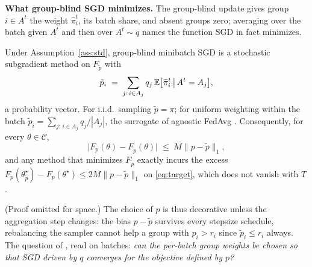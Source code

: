\noindent\textbf{What group-blind SGD minimizes.}
The group-blind update gives group $i\in A^t$ the weight $\widehat{\pi}^t_i$,
its batch share, and absent groups zero; averaging over the batch given
$A^t$ and then over $A^t\sim q$ \cite[Eq.~4]{rahimi2025agnostic} names the
function SGD in fact minimizes.

\begin{proposition}
\label{prop:surrogate}
Under Assumption~\ref{ass:std}, group-blind minibatch SGD is a stochastic
subgradient method on $F_{\tilde p}$ with
\begin{equation}
\tilde p_i\;=\;\sum_{j:\,i\in A_j} q_j\,\mathbb{E}\big[\widehat{\pi}^t_i\,\big|\,A^t=A_j\big],
\label{eq:ptilde}
\end{equation}
a probability vector. For i.i.d.\ sampling $\tilde p=\pi$; for uniform
weighting within the batch $\tilde p_i=\sum_{j:\,i\in A_j}q_j/|A_j|$, the
surrogate of agnostic \textsf{FedAvg} \cite[Eq.~2]{rahimi2025fedavot}.
Consequently, for every $\theta\in\mathcal{C}$,
\begin{equation}
\big|F_p(\theta)-F_{\tilde p}(\theta)\big|\;\le\;M\|p-\tilde p\|_1 ,
\label{eq:surrogate-gap}
\end{equation}
and any method that minimizes $F_{\tilde p}$ exactly incurs the excess
$F_p(\theta^\star_{\tilde p})-F_p(\theta^\star)\le 2M\|p-\tilde p\|_1$ on
\eqref{eq:target}, which does not vanish with $T$.
\end{proposition}
\noindent (Proof omitted for space.) The choice of $p$ is thus decorative
unless the aggregation step changes: the bias $p-\tilde p$ survives every
stepsize schedule, rebalancing the sampler cannot help a group with $p_i>r_i$
since $\tilde p_i\le r_i$ always. The question of \cite{rahimi2025fedavot},
read on batches: \emph{can the per-batch group weights be chosen so that SGD driven
by $q$ converges for the objective defined by $p$?}
